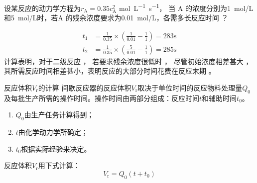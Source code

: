 \begin{frame}[t]
    \frametitle{}
    \begin{example}
        设某反应的动力学方程为$r_\mathrm{A}=0.35c_\mathrm{A}^2$ \si{mol.L^{-1}.s^{-1}}， 当 A 的浓度分别为\SI{1}{mol/L}和\SI{5}{mol/L}时，若A 的残余浓度要求为\SI{0.01}{mol/L}，各需多长反应时间 ？
    \end{example}
    \pause
    \[
        \begin{aligned}
            t_{1}&=\frac{1}{0.35}\times\left(\frac{1}{0.01}-\frac{1}{1}\right)=283\mathrm{s}\\
            t_{2}&=\frac{1}{0.35}\times\left(\frac{5}{0.01}-\frac{1}{1}\right)=285\mathrm{s}
        \end{aligned}
    \]
    计算表明，对于二级反应 ， 若要求残余浓度很低时 ， 尽管初始浓度相差甚大 ， 其所需反应时间相差甚小，表明反应的大部分时间花费在反应末期 。
\end{frame}




\begin{frame}{反应体积$V_\mathrm{r}$的计算}      
    间歇反应器的反应体积$V_\mathrm{r}$取决于单位时间的反应物料处理量$Q_0$及每批生产所需的操作时间。操作时间由两部分组成：反应时间$t$和辅助时间$t_0$。
    \begin{enumerate}
      \item $Q_0$由生产任务计算得到；
      \item $t$由化学动力学所确定；
      \item $t_0$根据实际经验来决定。
    \end{enumerate}
    反应体积$V_\mathrm{r}$用下式计算：
    \[
        V_\mathrm{r}=Q_0(t+t_0)
    \]
\end{frame}


